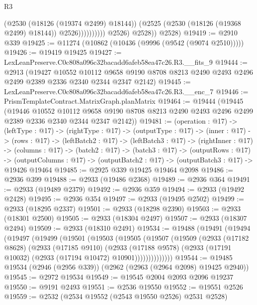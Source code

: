 \begin{lexlean}{R3}
\begin{coremodule}
                              (@2530 (@18126 (@19374 @2499) @18144))
                              (@2525 (@2530 (@18126 (@19368 @2499) @18144)) @2526))))))))))
            @2526)
          @2528))
      @2528)
@19419 := @2910 @339
@19425 := @11274 (@10862 (@10436 (@9996 (@9542 (@9074 @2510)))))
@19426 := @19419 @19425
@19427 := LexLeanPreserve.C0c808a096c32bacadd6afeb58ea47c26.R3.__fits_9
@19444 := @2913
    (@19427
      @10552
      @10112
      @9658
      @9190
      @8708
      @8213
      @2490
      @2493
      @2496
      @2499
      @2389
      @2336
      @2340
      @2344
      @2347
      @2142)
@19445 := LexLeanPreserve.C0c808a096c32bacadd6afeb58ea47c26.R3.__enc_7
@19446 := PrismTemplateContract.MatrixGraph.planMatrix
@19464 := @19444
    (@19445
      (@19446
        @10552
        @10112
        @9658
        @9190
        @8708
        @8213
        @2490
        @2493
        @2496
        @2499
        @2389
        @2336
        @2340
        @2344
        @2347
        @2142))
@19481 := (operation : @17) ->
  (leftType : @17) ->
  (rightType : @17) ->
  (outputType : @17) ->
  (inner : @17) ->
  (rows : @17) ->
  (leftBatch2 : @17) ->
  (leftBatch3 : @17) ->
  (rightInner : @17) ->
  (columns : @17) ->
  (batch2 : @17) ->
  (batch3 : @17) ->
  (outputRows : @17) ->
  (outputColumns : @17) -> (outputBatch2 : @17) -> (outputBatch3 : @17) -> @19426 @19464
@19485 := @2925 @339 @19425 @19464 @2098
@19486 := @2936 @399
@19488 := @2933 (@19486 @2368)
@19489 := @2936 @364
@19491 := @2933 (@19489 @2379)
@19492 := @2936 @359
@19494 := @2933 (@19492 @2428)
@19495 := @2936 @354
@19497 := @2933 (@19495 @2502)
@19499 := @2933 (@18295 @2337)
@19501 := @2933 (@18298 @2390)
@19503 := @2933 (@18301 @2500)
@19505 := @2933 (@18304 @2497)
@19507 := @2933 (@18307 @2494)
@19509 := @2933 (@18310 @2491)
@19534 := @19488
    (@19491
      (@19494
        (@19497
          (@19499
            (@19501
              (@19503
                (@19505
                  (@19507
                    (@19509
                      (@2933
                        (@17182 @8628)
                        (@2933
                          (@17185 @9110)
                          (@2933
                            (@17188 @9578)
                            (@2933 (@17191 @10032) (@2933 (@17194 @10472) @10901))))))))))))))
@19544 := @19485 @19534 (@2946 (@2956 @339)) (@2962 (@2963 (@2964 @2098) @19425 @2940))
@19545 := @2972 @19534
@19549 := @19545 @2004 @2093 @2096 @19237
@19550 := @9191 @2493
@19551 := @2536 @19550
@19552 := @19551 @2526
@19559 := @2532 (@2534 @19552 (@2543 @19550 @2526) @2531 @2528)

\end{coremodule}
\end{lexlean}
